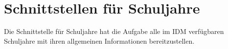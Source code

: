 \section{Schnittstellen für Schuljahre}
Die Schnittstelle für Schuljahre hat die Aufgabe alle im IDM verfügbaren Schuljahre mit ihren allgemeinen Informationen bereitzustellen.


